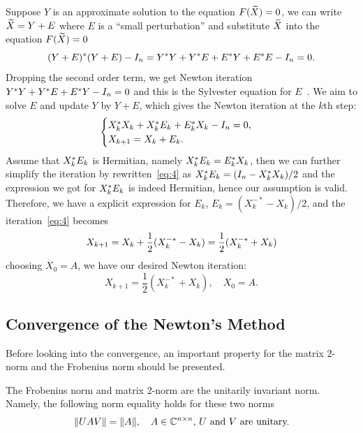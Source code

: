 \documentclass[12pt]{article}
\begin{document}
Suppose $Y$ is an approximate solution to the equation $F(\widetilde X) = 0$, we can write $\widetilde X = Y + E$ where $E$ is a ``small perturbation'' and substitute $\widetilde X$ into the equation $F(\widetilde X) = 0$
\begin{equation}\notag
    (Y+E)^* (Y+E) - I_n = Y^* Y + Y^* E + E^* Y + E^* E - I_n = 0.
\end{equation}
Dropping the second order term, we get Newton iteration $Y^* Y + Y^* E + E^* Y - I_n = 0$ and this is the Sylvester equation for $E$~. We aim to solve $E$ and update $Y$ by $Y + E$, which gives the Newton iteration at the $k$th step:
\begin{equation}\label{eq:4}
    \begin{cases}
        X_k ^* X_{k} + X_{k}^* E_k + E_k^* X_k - I_n = 0,\\
        X_{k+1} = X_{k} + E_k.
    \end{cases}
\end{equation}
Assume that $X_k^* E_k$ is Hermitian, namely $X_k^* E_k = E_k^* X_k$, then we can further simplify the iteration by rewritten~\eqref{eq:4} as $X_k^* E_k = (I_n - X_k^* X_k)/2$ and the expression we got for $X_k^* E_k$ is indeed Hermitian, hence our assumption is valid. Therefore, we have a explicit expression for $E_k$, $E_k = (X_k^{-*} - X_k)/2$, and the iteration~\eqref{eq:4} becomes 
\begin{equation}\notag
    X_{k+1} = X_{k} + \frac 12 (X_k^{-*}-X_k) = \frac 12(X_k^{-*} + X_k)
\end{equation}
choosing $X_0 = A$, we have our desired Newton iteration:
\begin{equation}
    \label{eq:newton-iteration}
    X_{k+1} = \frac 12(X_k^{-*} + X_k),\quad X_0 = A.
\end{equation}

\subsection{Convergence of the Newton's Method}

Before looking into the convergence, an important property for the matrix $2$-norm and the Frobenius norm should be presented.
\begin{theorem} 
    \label{thm:matrix-invariant-norm}
    The Frobenius norm and matrix 2-norm are the unitarily invariant norm. Namely, the following norm equality holds for these two norms
    \begin{equation}\notag
      \|{UAV}\| = \|{A}\|,\quad \text{$A\in\mathbb{C}^{n\times n}$, $U$ and $V$ are unitary.}
    \end{equation}
\end{theorem}
  
\end{document}
